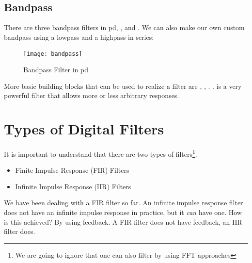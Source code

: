 \subsection{Bandpass} %
There are three bandpass filters in pd, ,  and .
We can also make our own custom bandpass using a lowpass and a highpass in series:
\begin{figure}[H]
	\centering
	\texttt{[image: bandpass]}
	\caption[bandpass]
	{Bandpass Filter in pd}
	\label{fig:label}
\end{figure}




More basic building blocks that can be used to realize a filter are , , . .  is a very powerful filter that allows more or less arbitrary responses.\\

\section{Types of Digital Filters}

It is important to understand that there are two types of filters\footnote{We are going to ignore that one can also filter by using FFT approaches}.
\begin{itemize}
	\item Finite Impulse Response (FIR) Filters
	\item Infinite Impulse Response (IIR) Filters
\end{itemize}

We have been dealing with a FIR filter so far. An infinite impulse response filter does not have an infinite impulse response in practice, but it \textit{can} have one. How is this achieved? By using feedback. A FIR filter does not have feedback, an IIR filter does.


